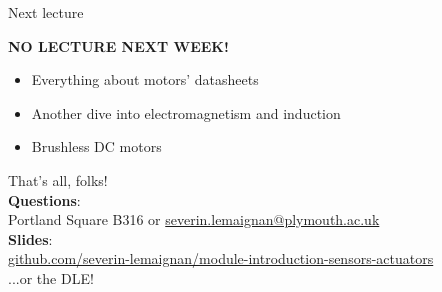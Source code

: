 \documentclass[compress]{beamer}
\makeatletter
\def\beamer@writeslidentry@miniframesoff{%
  \expandafter\beamer@ifempty\expandafter{\beamer@framestartpage}{}%
  {%
    \clearpage\beamer@notesactions%
  }
}
\newcommand*{\miniframesoff}{\let\beamer@writeslidentry=\beamer@writeslidentry@miniframesoff}
\makeatother
\begin{document}

\miniframesoff
\begin{frame}{Next lecture}
    \begin{center}
        \textbf{NO LECTURE NEXT WEEK!}
    \end{center}


    \begin{itemize}
        \item Everything about motors' datasheets
        \item Another dive into electromagnetism and induction
        \item Brushless DC motors
    \end{itemize}
\end{frame}

\begin{frame}{}
    \begin{center}
        \Large
        That's all, folks!\\[2em]


        \normalsize
        \textbf{Questions}:\\
        Portland Square B316 or \url{severin.lemaignan@plymouth.ac.uk} \\[1em]

        \textbf{Slides}:\\
        \href{https://github.com/severin-lemaignan/module-introduction-sensors-actuators}{\small
        github.com/severin-lemaignan/module-introduction-sensors-actuators} \\

        ...or the DLE!


    \end{center}
\end{frame}
\end{document}
